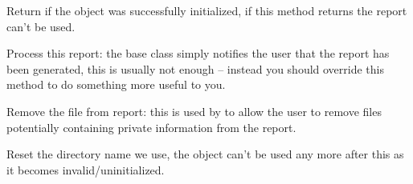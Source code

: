 Return \true if the object was successfully initialized, if this method returns 
\false the report can't be used.


\label{wxdebugreportprocess}


Process this report: the base class simply notifies the user that the
report has been generated, this is usually not enough -- instead you
should override this method to do something more useful to you.


\label{wxdebugreportremovefile}


Remove the file from report: this is used by 
 to allow the user to
remove files potentially containing private information from the report.


\label{wxdebugreportreset}


Reset the directory name we use, the object can't be used any more after
this as it becomes invalid/uninitialized.

